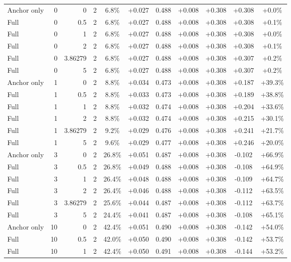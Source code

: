 \begin{table}[htbp]
\begin{tabular}{lrrrccccccc}
Anchor only & 0 & 0 & 2 & 6.8\% & +0.027 & 0.488 & +0.008 & +0.308 & +0.308 & +0.0\% \\
Full & 0 & 0.5 & 2 & 6.8\% & +0.027 & 0.488 & +0.008 & +0.308 & +0.308 & +0.1\% \\
Full & 0 & 1 & 2 & 6.8\% & +0.027 & 0.488 & +0.008 & +0.308 & +0.308 & +0.0\% \\
Full & 0 & 2 & 2 & 6.8\% & +0.027 & 0.488 & +0.008 & +0.308 & +0.308 & +0.1\% \\
Full & 0 & 3.86279 & 2 & 6.8\% & +0.027 & 0.488 & +0.008 & +0.308 & +0.307 & +0.2\% \\
Full & 0 & 5 & 2 & 6.8\% & +0.027 & 0.488 & +0.008 & +0.308 & +0.307 & +0.2\% \\
Anchor only & 1 & 0 & 2 & 8.8\% & +0.034 & 0.473 & +0.008 & +0.308 & +0.187 & +39.3\% \\
Full & 1 & 0.5 & 2 & 8.8\% & +0.033 & 0.473 & +0.008 & +0.308 & +0.189 & +38.8\% \\
Full & 1 & 1 & 2 & 8.8\% & +0.032 & 0.474 & +0.008 & +0.308 & +0.204 & +33.6\% \\
Full & 1 & 2 & 2 & 8.8\% & +0.032 & 0.474 & +0.008 & +0.308 & +0.215 & +30.1\% \\
Full & 1 & 3.86279 & 2 & 9.2\% & +0.029 & 0.476 & +0.008 & +0.308 & +0.241 & +21.7\% \\
Full & 1 & 5 & 2 & 9.6\% & +0.029 & 0.477 & +0.008 & +0.308 & +0.246 & +20.0\% \\
Anchor only & 3 & 0 & 2 & 26.8\% & +0.051 & 0.487 & +0.008 & +0.308 & -0.102 & +66.9\% \\
Full & 3 & 0.5 & 2 & 26.8\% & +0.049 & 0.488 & +0.008 & +0.308 & -0.108 & +64.9\% \\
Full & 3 & 1 & 2 & 26.4\% & +0.048 & 0.488 & +0.008 & +0.308 & -0.109 & +64.7\% \\
Full & 3 & 2 & 2 & 26.4\% & +0.046 & 0.488 & +0.008 & +0.308 & -0.112 & +63.5\% \\
Full & 3 & 3.86279 & 2 & 25.6\% & +0.044 & 0.487 & +0.008 & +0.308 & -0.112 & +63.7\% \\
Full & 3 & 5 & 2 & 24.4\% & +0.041 & 0.487 & +0.008 & +0.308 & -0.108 & +65.1\% \\
Anchor only & 10 & 0 & 2 & 42.4\% & +0.051 & 0.490 & +0.008 & +0.308 & -0.142 & +54.0\% \\
Full & 10 & 0.5 & 2 & 42.0\% & +0.050 & 0.490 & +0.008 & +0.308 & -0.142 & +53.7\% \\
Full & 10 & 1 & 2 & 42.4\% & +0.050 & 0.491 & +0.008 & +0.308 & -0.144 & +53.2\% \\

\end{tabular}
\end{table}
